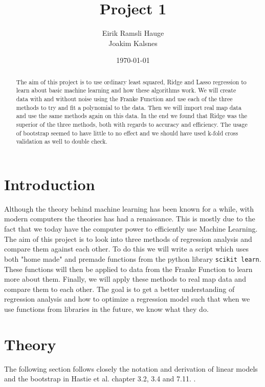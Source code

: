 \documentclass[12pt]{article}
\title{Project 1}
\author{Eirik Ramsli Hauge\\
Joakim Kalsnes
}
\date{\today}
\begin{document}
\maketitle

\begin{abstract}
The aim of this project is to use ordinary least squared, Ridge and Lasso regression to learn about basic machine learning and how these algorithms work. We will create data with and without noise using the Franke Function and use each of the three methods to try and fit a polynomial to the data. Then we will import real map data and use the same methods again on this data. In the end we found that Ridge was the superior of the three methods, both with regards to accuracy and efficiency. The usage of bootstrap seemed to have little to no effect and we should have used k-fold cross validation as well to double check. 
\end{abstract}
\section{Introduction}   \label{s:i}
Although the theory behind machine learning has been known for a while, with modern computers the theories has had a renaissance. This is mostly due to the fact that we today have the computer power to efficiently use Machine Learning. The aim of this project is to look into three methods of regression analysis and compare them against each other. To do this we will write a script which uses both "home made" and premade functions from the python library \texttt{scikit learn}. These functions will then be applied to data from the Franke Function to learn more about them. Finally, we will apply these methods to real map data and compare them to each other. The goal is to get a better understanding of regression analysis and how to optimize a regression model such that when we use functions from libraries in the future, we know what they do.
\section{Theory} \label{s:t}
The following section follows closely the notation and derivation of linear models and the bootstrap in Hastie et al. chapter 3.2, 3.4 and 7.11. \cite{Hastie}.
\end{document}
